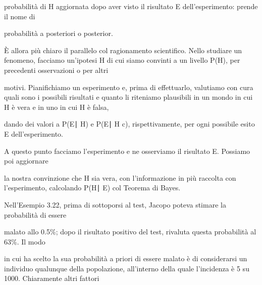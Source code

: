 \documentclass[a4paper,portrait,12pt]{article}
\begin{document}
\begin{flushleft}
probabilit\`{a} di H aggiornata dopo aver visto il risultato E dell'esperimento: prende il nome di
\end{flushleft}


\begin{flushleft}
probabilit\`{a} a posteriori o posterior.
\end{flushleft}


\begin{flushleft}
\`{E} allora più chiaro il parallelo col ragionamento scientifico. Nello studiare un fenomeno, facciamo un'ipotesi H di cui siamo convinti a un livello P(H), per precedenti osservazioni o per altri
\end{flushleft}


\begin{flushleft}
motivi. Pianifichiamo un esperimento e, prima di effettuarlo, valutiamo con cura quali sono i possibili risultati e quanto li riteniamo plausibili in un mondo in cui H \`{e} vera e in uno in cui H \`{e} falsa,
\end{flushleft}


\begin{flushleft}
dando dei valori a P(E∣ H) e P(E∣ H c), rispettivamente, per ogni possibile esito E dell'esperimento.
\end{flushleft}


\begin{flushleft}
A questo punto facciamo l'esperimento e ne osserviamo il risultato E. Possiamo poi aggiornare
\end{flushleft}


\begin{flushleft}
la nostra convinzione che H sia vera, con l'informazione in più raccolta con l'esperimento, calcolando P(H∣ E) col Teorema di Bayes.
\end{flushleft}


\begin{flushleft}
Nell'Esempio 3.22, prima di sottoporsi al test, Jacopo poteva stimare la probabilit\`{a} di essere
\end{flushleft}


\begin{flushleft}
malato allo 0.5\%; dopo il risultato positivo del test, rivaluta questa probabilit\`{a} al 63\%. Il modo
\end{flushleft}


\begin{flushleft}
in cui ha scelto la sua probabilit\`{a} a priori di essere malato \`{e} di considerarsi un individuo qualunque della popolazione, all'interno della quale l'incidenza \`{e} 5 su 1000. Chiaramente altri fattori
\end{flushleft}
\end{document}
